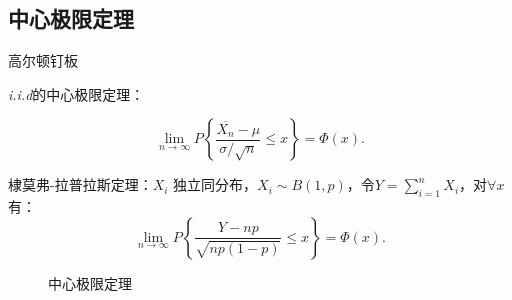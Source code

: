 \subsection{中心极限定理}%
\label{sub:中心极限定理}
\begin{eg}
    高尔顿钉板
\end{eg}
\begin{cor}
    \textit{i.i.d}的中心极限定理：

    \[
        \lim_{n \to \infty} P\left\{ \frac{\overline{X_n}-\mu}{\sigma /\sqrt{n}  }\le x  \right\} =\Phi\left( x \right) 
    .\] 
\end{cor}
\begin{cor}
    棣莫弗-拉普拉斯定理：$X_i$ 独立同分布，$X_i\sim B\left( 1,p \right) $，令$Y=\sum_{i=1}^{n} X_i$，对$\forall x$ 有：
    \[
        \lim_{n \to \infty} P\left\{ \frac{Y-np}{\sqrt{np\left( 1-p \right) } } \le x \right\} =\Phi\left( x \right) 
    .\]
\end{cor}
\begin{figure}[ht]
    \centering
    \caption{中心极限定理}
    \label{fig:中心极限定理}
\end{figure}
